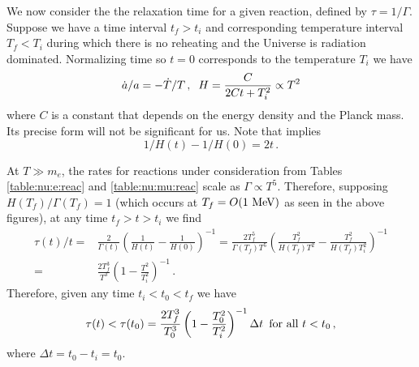 We now consider the the relaxation time for a given reaction, defined by $\tau=1/\Gamma$. Suppose we have a time interval $t_f>t_i$ and corresponding temperature interval $T_f<T_i$ during which there is no reheating and the Universe is radiation dominated. Normalizing time so $t=0$ corresponds to the temperature $T_i$ we have
\begin{equation}\label{ch6:H_eq}
\dot a/a=-\dot T/T\,,\hspace{2mm} H=\frac{C}{2Ct+T_i^2}\propto T^2
\end{equation}
where $C$ is a constant that depends on the energy density and the Planck mass. Its precise form will not be significant for us. Note that  implies
\begin{equation}
1/H(t)-1/H(0)=2t\,.
\end{equation}

At $T\gg m_e$, the rates for reactions under consideration from Tables \ref{table:nu:e:reac} and \ref{table:nu:mu:reac} scale as $\Gamma\propto T^5$. Therefore, supposing $H(T_f)/\Gamma(T_f)=1$ (which occurs at $T_f=O(1\text{ MeV})$ as seen in the above figures), at any time $t_f>t>t_i$ we find 
\begin{align}\label{relax_time}
\tau(t)/t=&\frac{2}{\Gamma(t)}\left(\frac{1}{H(t)}-\frac{1}{H(0)}\right)^{-1}=\frac{2T_f^5}{\Gamma(T_f)T^5}\left(\frac{T_f^2}{H(T_f)T^2}-\frac{T_f^2}{H(T_f)T_i^2}\right)^{-1}\\
=&\frac{2T_f^3}{T^3}\left(1-\frac{T^2}{T_i^2}\right)^{-1}\,.
\end{align}
Therefore, given any time $t_i<t_0<t_f$ we have
\begin{equation}\label{ch6:tau_eq}
\tau(t)<\tau(t_0)=\frac{2T_f^3}{T_0^3}\left(1-\frac{T_0^2}{T_i^2}\right)^{-1}\Delta t \text{ \,for all } t<t_0\,,
\end{equation}
where $\Delta t=t_0-t_i=t_0$.

